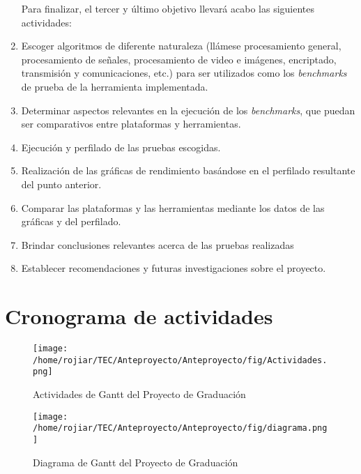 \begin{enumerate}
 Para finalizar, el tercer y último objetivo llevará acabo las siguientes actividades: \\
 
 \item Escoger algoritmos de diferente naturaleza (llámese procesamiento general, procesamiento de señales, 
 procesamiento de video e imágenes, encriptado, transmisión y comunicaciones, etc.) para ser utilizados como los
 \textit{benchmarks} de prueba de la herramienta implementada.
 \item Determinar aspectos relevantes en la ejecución de los \textit{benchmarks}, que puedan ser comparativos entre
 plataformas y herramientas.
 \item Ejecución y perfilado de las pruebas escogidas.
 \item Realización de las gráficas de rendimiento basándose en el perfilado resultante del punto anterior.
 \item Comparar las plataformas y las herramientas mediante los datos de las gráficas y del perfilado.
 \item Brindar conclusiones relevantes acerca de las pruebas realizadas
 \item Establecer recomendaciones y futuras investigaciones sobre el proyecto.
 
\end{enumerate}

\newpage
\section{Cronograma de actividades}

\begin{figure}[htb]
\centering
  \texttt{[image: /home/rojiar/TEC/Anteproyecto/Anteproyecto/fig/Actividades.png]}
  \caption{Actividades de Gantt del Proyecto de Graduación}
  \label{fig:Actividades de Gantt}
\end{figure}

\newpage

\begin{figure}[htb]
  \centering
  \texttt{[image: /home/rojiar/TEC/Anteproyecto/Anteproyecto/fig/diagrama.png]}
  \caption{Diagrama de Gantt del Proyecto de Graduación}
  \label{fig:Diagrama de Gantt}
\end{figure}






